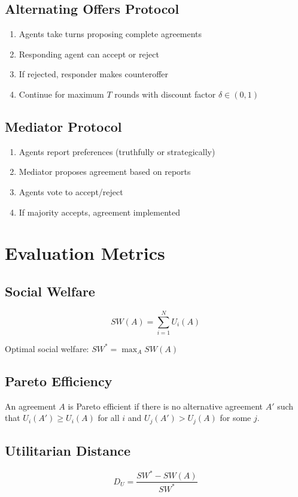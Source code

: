 \documentclass[11pt]{article}
\begin{document}
\subsection{Alternating Offers Protocol}
\begin{enumerate}
    \item Agents take turns proposing complete agreements
    \item Responding agent can accept or reject
    \item If rejected, responder makes counteroffer
    \item Continue for maximum $T$ rounds with discount factor $\delta \in (0,1)$
\end{enumerate}

\subsection{Mediator Protocol}
\begin{enumerate}
    \item Agents report preferences (truthfully or strategically)
    \item Mediator proposes agreement based on reports
    \item Agents vote to accept/reject
    \item If majority accepts, agreement implemented
\end{enumerate}

\section{Evaluation Metrics}

\subsection{Social Welfare}
\begin{equation}
SW(A) = \sum_{i=1}^{N} U_i(A)
\end{equation}

Optimal social welfare: $SW^* = \max_{A} SW(A)$

\subsection{Pareto Efficiency}
An agreement $A$ is Pareto efficient if there is no alternative agreement $A'$ such that $U_i(A') \geq U_i(A)$ for all $i$ and $U_j(A') > U_j(A)$ for some $j$.

\subsection{Utilitarian Distance}
\begin{equation}
D_U = \frac{SW^* - SW(A)}{SW^*}
\end{equation}
\end{document}
